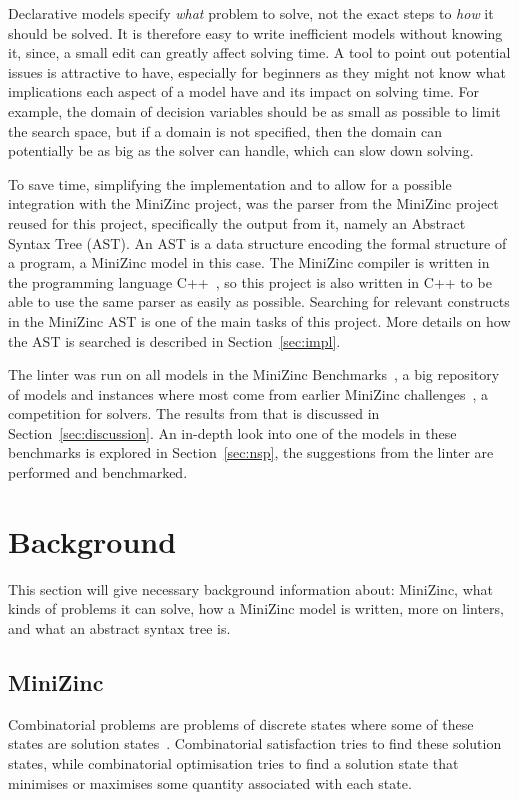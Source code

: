 \documentclass[a4paper,12pt]{article}
\begin{document}
Declarative models specify \emph{what} problem to solve, not the exact steps to \emph{how}
it should be solved. It is therefore easy to write inefficient models without knowing it,
since, a small edit can greatly affect solving time. A tool to point out potential issues
is attractive to have, especially for beginners as they might not know what implications
each aspect of a model have and its impact on solving time. For example, the domain of
decision variables should be as small as possible to limit the search space, but if a
domain is not specified, then the domain can potentially be as big as the solver can
handle, which can slow down solving.

To save time, simplifying the implementation and to allow for a possible integration with
the MiniZinc project, was the parser from the MiniZinc project reused for this project,
specifically the output from it, namely an Abstract Syntax Tree (AST). An AST is a data
structure encoding the formal structure of a program, a MiniZinc model in this case. The
MiniZinc compiler is written in the programming language C++~\cite{cpp}, so this project
is also written in C++ to be able to use the same parser as easily as possible.
Searching
for relevant constructs in the MiniZinc AST is one of the main tasks of this project. More
details on how the AST is searched is described in Section~\ref{sec:impl}.

\begin{sloppypar}
The linter was run on all models in the MiniZinc Benchmarks~\cite{mznbench}, a
big repository of models and instances where most come from earlier MiniZinc
challenges~\cite{MZN:Challenge}, a competition for solvers. The results from that is
discussed in Section~\ref{sec:discussion}. An in-depth look into one of the models in
these benchmarks is explored in Section~\ref{sec:nsp}, the suggestions from the linter are
performed and benchmarked.
\end{sloppypar}

\section{Background}\label{sec:bakgrund}
This section will give necessary background information about: MiniZinc, what kinds of
problems it can solve, how a MiniZinc model is written, more on linters, and what
an abstract syntax tree is.

\subsection{MiniZinc}\label{sec:mzn}
Combinatorial problems are problems of discrete states where some of these states are
solution states~\cite{combopt}. Combinatorial satisfaction tries to find these solution states,
while combinatorial optimisation tries to find a solution state that minimises or
maximises some quantity associated with each state.
\end{document}
